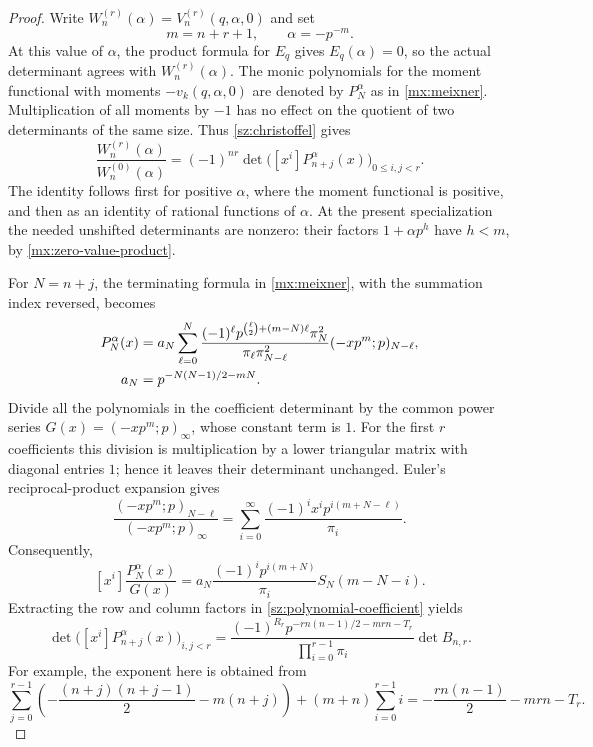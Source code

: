 \documentclass[11pt]{article}
\numberwithin{equation}{section}
\theoremstyle{definition}
\theoremstyle{remark}
\begin{document}
\begin{proof}
Write $W_n^{(r)}(\alpha)=V_n^{(r)}(q,\alpha,0)$ and set
\[
 m=n+r+1,\qquad \alpha=-p^{-m}.
\]
At this value of $\alpha$, the product formula for $E_q$ gives
$E_q(\alpha)=0$, so the actual determinant agrees with
$W_n^{(r)}(\alpha)$.  The monic polynomials for the moment functional
with moments $-v_k(q,\alpha,0)$ are denoted by $P_N^\alpha$ as in
\cref{mx:meixner}.  Multiplication of all moments by $-1$ has no effect
on the quotient of two determinants of the same size.  Thus
\cref{sz:christoffel} gives
\begin{equation}\label{sz:W-ratio}
 \frac{W_n^{(r)}(\alpha)}{W_n^{(0)}(\alpha)}
 =(-1)^{nr}
 \det\bigl([x^i]P_{n+j}^\alpha(x)\bigr)_{0\le i,j<r}.
\end{equation}
The identity follows first for positive $\alpha$, where the moment
functional is positive, and then as an identity of rational functions
of $\alpha$.  At the present specialization the needed unshifted
determinants are nonzero: their factors $1+\alpha p^h$ have $h<m$,
by \cref{mx:zero-value-product}.

For $N=n+j$, the terminating formula in \cref{mx:meixner}, with the
summation index reversed, becomes
\begin{align}
 P_N^\alpha(x)
 &=a_N\sum_{\ell=0}^{N}
 \frac{(-1)^\ell p^{\binom{\ell}{2}+(m-N)\ell}\pi_N^2}
 {\pi_\ell\pi_{N-\ell}^2}
 (-xp^m;p)_{N-\ell},\label{sz:reversed-polynomial}\\
 a_N&=p^{-N(N-1)/2-mN}.\notag
\end{align}
Divide all the polynomials in the coefficient determinant by the
common power series
$G(x)=(-xp^m;p)_\infty$, whose constant term is $1$.
For the first $r$ coefficients this division is multiplication by a
lower triangular matrix with diagonal entries $1$; hence it leaves
their determinant unchanged.  Euler's reciprocal-product expansion
gives
\[
 \frac{(-xp^m;p)_{N-\ell}}{(-xp^m;p)_\infty}
 =\sum_{i=0}^{\infty}
 \frac{(-1)^i x^i p^{i(m+N-\ell)}}{\pi_i}.
\]
Consequently,
\begin{equation}\label{sz:polynomial-coefficient}
 [x^i]\frac{P_N^\alpha(x)}{G(x)}
 =a_N\frac{(-1)^ip^{i(m+N)}}{\pi_i}
 S_N(m-N-i).
\end{equation}
Extracting the row and column factors in
\eqref{sz:polynomial-coefficient} yields
\begin{equation}\label{sz:coefficient-prefactor}
 \det\bigl([x^i]P_{n+j}^\alpha(x)\bigr)_{i,j<r}
 =\frac{(-1)^{R_r}
 p^{-rn(n-1)/2-mrn-T_r}}{\prod_{i=0}^{r-1}\pi_i}
 \det B_{n,r}.
\end{equation}
For example, the exponent here is obtained from
\[
 \sum_{j=0}^{r-1}\left(-\frac{(n+j)(n+j-1)}2-m(n+j)\right)
 +(m+n)\sum_{i=0}^{r-1}i
 =-\frac{rn(n-1)}2-mrn-T_r.
\]


\end{proof}
\end{document}
